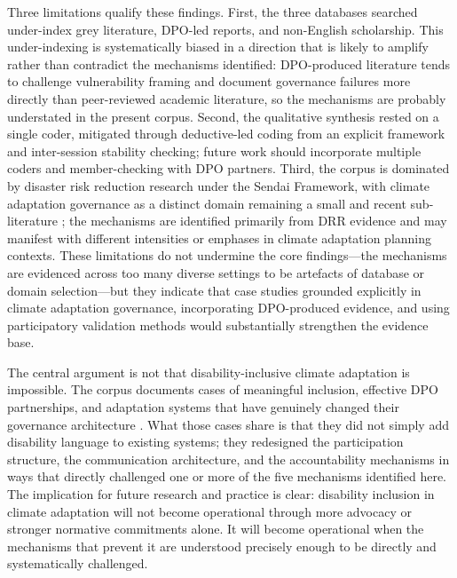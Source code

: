 \documentclass[12pt,a4paper]{article}
\begin{document}
Three limitations qualify these findings. First, the three databases searched under-index grey literature, DPO-led reports, and non-English scholarship. This under-indexing is systematically biased in a direction that is likely to amplify rather than contradict the mechanisms identified: DPO-produced literature tends to challenge vulnerability framing and document governance failures more directly than peer-reviewed academic literature, so the mechanisms are probably understated in the present corpus. Second, the qualitative synthesis rested on a single coder, mitigated through deductive-led coding from an explicit framework and inter-session stability checking; future work should incorporate multiple coders and member-checking with DPO partners. Third, the corpus is dominated by disaster risk reduction research under the Sendai Framework, with climate adaptation governance as a distinct domain remaining a small and recent sub-literature \cite{brown2025massachusetts,engelman2025california,pirmasari2023halinai}; the mechanisms are identified primarily from DRR evidence and may manifest with different intensities or emphases in climate adaptation planning contexts. These limitations do not undermine the core findings---the mechanisms are evidenced across too many diverse settings to be artefacts of database or domain selection---but they indicate that case studies grounded explicitly in climate adaptation governance, incorporating DPO-produced evidence, and using participatory validation methods would substantially strengthen the evidence base.

The central argument is not that disability-inclusive climate adaptation is impossible. The corpus documents cases of meaningful inclusion, effective DPO partnerships, and adaptation systems that have genuinely changed their governance architecture \cite{pertiwi2019dpo,villeneuve2021pcep,ton2021agency,rahatiningtyas2025yogyakarta,webb2020vanuatu}. What those cases share is that they did not simply add disability language to existing systems; they redesigned the participation structure, the communication architecture, and the accountability mechanisms in ways that directly challenged one or more of the five mechanisms identified here. The implication for future research and practice is clear: disability inclusion in climate adaptation will not become operational through more advocacy or stronger normative commitments alone. It will become operational when the mechanisms that prevent it are understood precisely enough to be directly and systematically challenged.
\end{document}
